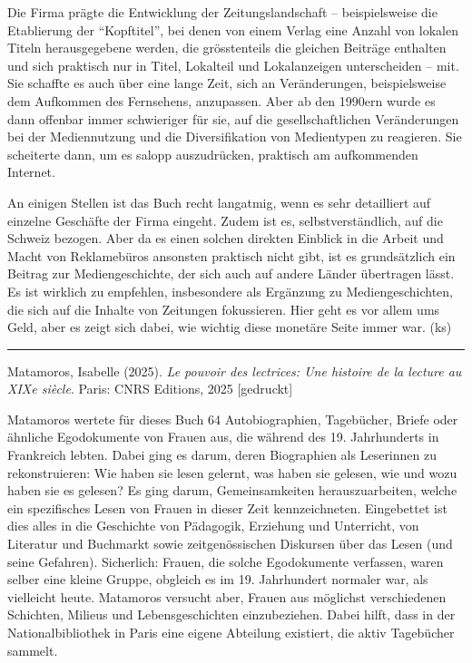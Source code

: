 \documentclass[a4paper,
fontsize=11pt,
oneside,
numbers=noperiodatend,
parskip=half-,
bibliography=totoc,
final
]{scrartcl}
\begin{document}
Die Firma prägte die Entwicklung der Zeitungslandschaft --
beispielsweise die Etablierung der \enquote{Kopftitel}, bei denen von
einem Verlag eine Anzahl von lokalen Titeln herausgegebene werden, die
grösstenteils die gleichen Beiträge enthalten und sich praktisch nur in
Titel, Lokalteil und Lokalanzeigen unterscheiden -- mit. Sie schaffte es
auch über eine lange Zeit, sich an Veränderungen, beispielsweise dem
Aufkommen des Fernsehens, anzupassen. Aber ab den 1990ern wurde es dann
offenbar immer schwieriger für sie, auf die gesellschaftlichen
Veränderungen bei der Mediennutzung und die Diversifikation von
Medientypen zu reagieren. Sie scheiterte dann, um es salopp
auszudrücken, praktisch am aufkommenden Internet.

An einigen Stellen ist das Buch recht langatmig, wenn es sehr
detailliert auf einzelne Geschäfte der Firma eingeht. Zudem ist es,
selbstverständlich, auf die Schweiz bezogen. Aber da es einen solchen
direkten Einblick in die Arbeit und Macht von Reklamebüros ansonsten
praktisch nicht gibt, ist es grundsätzlich ein Beitrag zur
Mediengeschichte, der sich auch auf andere Länder übertragen lässt. Es
ist wirklich zu empfehlen, insbesondere als Ergänzung zu
Mediengeschichten, die sich auf die Inhalte von Zeitungen fokussieren.
Hier geht es vor allem ums Geld, aber es zeigt sich dabei, wie wichtig
diese monetäre Seite immer war. (ks)

\begin{center}\rule{0.5\linewidth}{0.5pt}\end{center}

Matamoros, Isabelle (2025). \emph{Le pouvoir des lectrices: Une histoire
de la lecture au XIXe siècle}. Paris: CNRS Editions, 2025 {[}gedruckt{]}

Matamoros wertete für dieses Buch 64 Autobiographien, Tagebücher, Briefe
oder ähnliche Egodokumente von Frauen aus, die während des 19.
Jahrhunderts in Frankreich lebten. Dabei ging es darum, deren
Biographien als Leserinnen zu rekonstruieren: Wie haben sie lesen
gelernt, was haben sie gelesen, wie und wozu haben sie es gelesen? Es
ging darum, Gemeinsamkeiten herauszuarbeiten, welche ein spezifisches
Lesen von Frauen in dieser Zeit kennzeichneten. Eingebettet ist dies
alles in die Geschichte von Pädagogik, Erziehung und Unterricht, von
Literatur und Buchmarkt sowie zeitgenössischen Diskursen über das Lesen
(und seine Gefahren). Sicherlich: Frauen, die solche Egodokumente
verfassen, waren selber eine kleine Gruppe, obgleich es im 19.
Jahrhundert normaler war, als vielleicht heute. Matamoros versucht aber,
Frauen aus möglichst verschiedenen Schichten, Milieus und
Lebensgeschichten einzubeziehen. Dabei hilft, dass in der
Nationalbibliothek in Paris eine eigene Abteilung existiert, die aktiv
Tagebücher sammelt.
\end{document}

